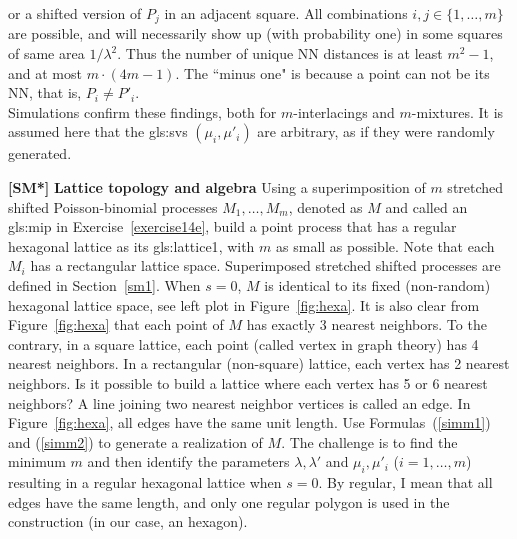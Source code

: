 \documentclass[10pt]{article}
\begin{document}
\begin{Exercise}
or a shifted version of $P_j$ in an adjacent square. All combinations $i,j\in\{1,\dots,m\}$ are possible, and will necessarily show up (with probability one) in some squares of same area $1/\lambda^2$. Thus the number of unique NN distances is at least $m^2-1$, and at most $m\cdot(4m-1)$. The ``minus one" is because a point can not be its NN, that is, $P_i\neq P'_i$. \vspace{1ex} \\
Simulations confirm these findings, both for $m$-interlacings and $m$-mixtures. It is assumed here that the 
\glspl{gls:sv} $(\mu_i,\mu'_i)$ are arbitrary, as if they were randomly generated.
\end{Exercise}

\begin{Exercise}\label{exercise14f}{\bf [SM*]} {\bf Lattice topology and algebra} Using a superimposition of $m$ stretched shifted Poisson-binomial processes $M_1,\dots,M_m$, denoted as $M$ and called an 
\gls{gls:mip} 
in Exercise~\ref{exercise14e}, build a point process 
that has a regular \textcolor{index}{hexagonal lattice} as its 
\gls{gls:lattice1}, 
with $m$ as small as possible. Note that each $M_i$ has a 
rectangular lattice space. Superimposed stretched shifted processes are defined in Section~\ref{sm1}. When $s=0$, $M$ is identical to its fixed (non-random) hexagonal lattice space, see left plot in Figure~\ref{fig:hexa}.  It is also clear from Figure~\ref{fig:hexa} that each point of $M$ has exactly 3 nearest neighbors. To the contrary, in a square lattice, each point (called 
\textcolor{index}{vertex} in 
\textcolor{index}{graph theory}) has 4 nearest neighbors. In a rectangular (non-square) lattice, each vertex 
has 2 nearest neighbors. Is it possible to build a lattice where each vertex has 5 or 6 nearest neighbors? A line joining two nearest neighbor vertices is called an \textcolor{index}{edge}. In Figure~\ref{fig:hexa}, all edges have the same unit length. 
Use Formulas~(\ref{simm1}) and (\ref{simm2}) to generate a realization of $M$. The challenge is to find the minimum $m$ and then identify the parameters $\lambda,\lambda'$ and $\mu_i,\mu'_i$ ($i=1,\dots,m$) resulting in a regular hexagonal lattice when $s=0$. By regular, I mean that all edges have the same length, and only one regular polygon is used in the construction (in our case, an hexagon). \vspace{1ex} \\

\end{Exercise}
\end{document}
